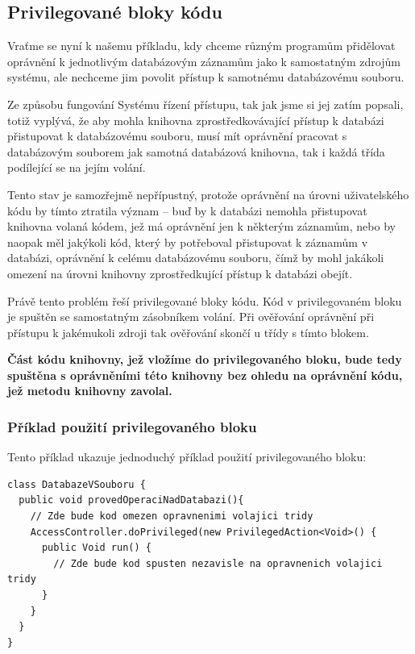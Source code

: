 \subsection{Privilegované bloky kódu}\label{privilegovaneBloky}

Vraťme se nyní k našemu příkladu, kdy chceme různým programům přidělovat oprávnění k jednotlivým databázovým záznamům jako k samostatným zdrojům systému, ale nechceme jim povolit přístup k samotnému databázovému souboru.

Ze způsobu fungování Systému řízení přístupu, tak jak jsme si jej zatím popsali, totiž vyplývá, že aby mohla knihovna zprostředkovávající přístup k databázi přistupovat k databázovému souboru, musí mít oprávnění pracovat s databázovým souborem jak samotná databázová knihovna, tak i každá třída podílející se na jejím volání.

Tento stav je samozřejmě nepřípustný, protože oprávnění na úrovni uživatelského kódu by tímto ztratila význam -- buď by k databázi nemohla přistupovat knihovna volaná kódem, jež má oprávnění jen k některým záznamům, nebo by naopak měl jakýkoli kód, který by potřeboval přistupovat k záznamům v databázi, oprávnění k celému databázovému souboru, čímž by mohl jakákoli omezení na úrovni knihovny zprostředkující přístup k databázi obejít.

Právě tento problém řeší privilegované bloky kódu. Kód v privilegovaném bloku je spuštěn se samostatným zásobníkem volání. Při ověřování oprávnění při přístupu k jakémukoli zdroji tak ověřování skončí u třídy s tímto blokem.

{\bf Část kódu knihovny, jež vložíme do privilegovaného bloku, bude tedy spuštěna s oprávněními této knihovny bez ohledu na oprávnění kódu, jež metodu knihovny zavolal.}

\subsubsection{Příklad použití privilegovaného bloku}

Tento příklad ukazuje jednoduchý příklad použití privilegovaného bloku: \cite{refAccessController}

\begin{lstlisting}[caption=Příklad použití privilegovaného bloku, label=prikladBloku]
class DatabazeVSouboru {
  public void provedOperaciNadDatabazi(){
    // Zde bude kod omezen opravnenimi volajici tridy
    AccessController.doPrivileged(new PrivilegedAction<Void>() {
      public Void run() {
        // Zde bude kod spusten nezavisle na opravnenich volajici tridy
      }
    }
  }
}
\end{lstlisting}

